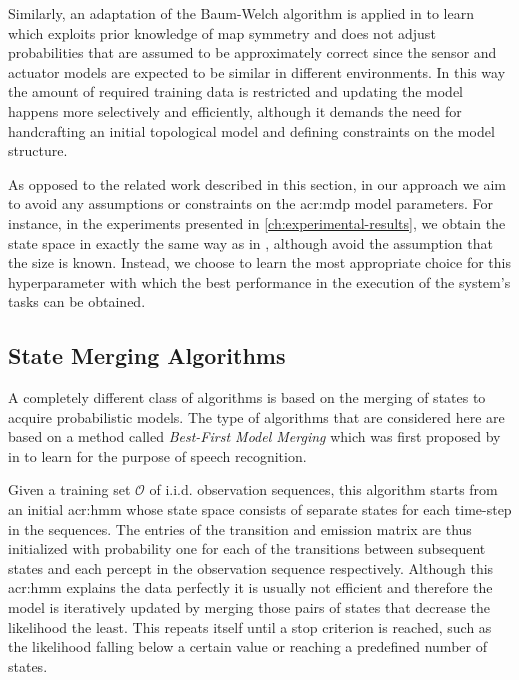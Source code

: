 Similarly, an adaptation of the Baum-Welch algorithm is applied in \cite{koenig1996unsupervised} to learn  which exploits prior knowledge of map symmetry and does not adjust probabilities that are assumed to be approximately correct since the sensor and actuator models are expected to be similar in different environments.
In this way the amount of required training data is restricted and updating the model happens more selectively and efficiently, although it demands the need for handcrafting an initial topological model and defining constraints on the model structure.

As opposed to the related work described in this section, in our approach we aim to avoid any assumptions or constraints on the \acrshort{acr:mdp} model parameters.
For instance, in the experiments presented in \autoref{ch:experimental-results}, we obtain the state space in exactly the same way as in \cite{shatkay1997learning}, although avoid the assumption that the size is known.
Instead, we choose to learn the most appropriate choice for this hyperparameter with which the best performance in the execution of the system's tasks can be obtained.


\subsection{State Merging Algorithms}
\label{sec:state-merging}

A completely different class of algorithms is based on the merging of states to acquire probabilistic models.
The type of algorithms that are considered here are based on a method called \textit{Best-First Model Merging} which was first proposed by \citeauthor{stolcke1994best} in \cite{stolcke1994best} to learn  for the purpose of speech recognition.

\newpage

Given a training set $\mathcal{O}$ of i.i.d. observation sequences, this algorithm starts from an initial \acrshort{acr:hmm} whose state space consists of separate states for each time-step in the sequences.
The entries of the transition and emission matrix are thus initialized with probability one for each of the transitions between subsequent states and each percept in the observation sequence respectively.
Although this \acrshort{acr:hmm} explains the data perfectly it is usually not efficient and therefore the model is iteratively updated by merging those pairs of states that decrease the likelihood the least.
This repeats itself until a stop criterion is reached, such as the likelihood falling below a certain value or reaching a predefined number of states.

